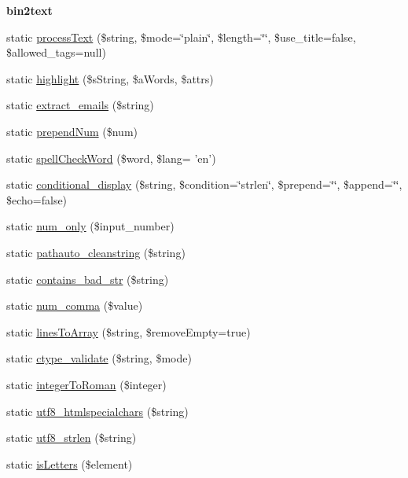 \begin{Indent}{\bf bin2text}
\begin{DoxyCompactItemize}
\item 
static \hyperlink{class_strings_a433127006b2ea7151e2a7877ed272621}{process\-Text} (\$string, \$mode=\char`\"{}plain\char`\"{}, \$length=\char`\"{}\char`\"{}, \$use\-\_\-title=false, \$allowed\-\_\-tags=null)
\item 
static \hyperlink{class_strings_ae843da392a76ffa825bee0e70342b3a9}{highlight} (\$s\-String, \$a\-Words, \$attrs)
\item 
static \hyperlink{class_strings_a94232c579b4e4df2830ffcbfddadcc5f}{extract\-\_\-emails} (\$string)
\item 
static \hyperlink{class_strings_aaabe21b17c4289b360cb20ccbdc90d77}{prepend\-Num} (\$num)
\item 
static \hyperlink{class_strings_aec7a04a9b5197ca7b8ba429f80cf85ed}{spell\-Check\-Word} (\$word, \$lang= 'en')
\item 
static \hyperlink{class_strings_a83d0d4a095435c92915b18021eadcaf5}{conditional\-\_\-display} (\$string, \$condition=\char`\"{}strlen\char`\"{}, \$prepend=\char`\"{}\char`\"{}, \$append=\char`\"{}\char`\"{}, \$echo=false)
\item 
static \hyperlink{class_strings_a688d9b95c78a5c809da30f5e7bea4187}{num\-\_\-only} (\$input\-\_\-number)
\item 
static \hyperlink{class_strings_a212cd615790b9d01349e4e4c64eaca9b}{pathauto\-\_\-cleanstring} (\$string)
\item 
static \hyperlink{class_strings_ac31b2c9c217842e6cd3c02a669dd33ed}{contains\-\_\-bad\-\_\-str} (\$string)
\item 
static \hyperlink{class_strings_a391db499dd854a7077a6eb36b48b8bfe}{num\-\_\-comma} (\$value)
\item 
static \hyperlink{class_strings_ab3b44775b5442acf1bdc3b38c138e63b}{lines\-To\-Array} (\$string, \$remove\-Empty=true)
\item 
static \hyperlink{class_strings_a8c8aedf7b92d1f2f5e789fbb6e23cf8d}{ctype\-\_\-validate} (\$string, \$mode)
\item 
static \hyperlink{class_strings_a9f20d2a99d89e68e6c55b04ab387d6e6}{integer\-To\-Roman} (\$integer)
\item 
static \hyperlink{class_strings_ac260a1af801f29667351cf3959c12cde}{utf8\-\_\-htmlspecialchars} (\$string)
\item 
static \hyperlink{class_strings_a1d867a0e3ca8a72e86d04f5031cb0f21}{utf8\-\_\-strlen} (\$string)
\item 
static \hyperlink{class_strings_ad4f4ec2937699f525ca544845680cd55}{is\-Letters} (\$element)

\end{DoxyCompactItemize}
\end{Indent}
